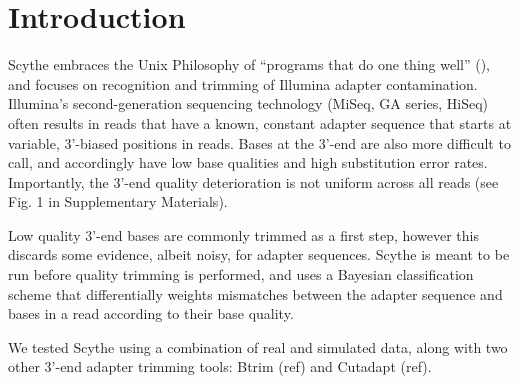 \documentclass{bioinfo}
\begin{document}
\section{Introduction}
Scythe embraces the Unix Philosophy of ``programs that do one thing
well'' (\citealp{raymond2003}), and focuses on recognition and
trimming of Illumina adapter contamination. Illumina's
second-generation sequencing technology (MiSeq, GA series, HiSeq)
often results in reads that have a known, constant adapter sequence
that starts at variable, 3'-biased positions in reads. Bases at the
3'-end are also more difficult to call, and accordingly have low base
qualities and high substitution error rates. Importantly, the 3'-end
quality deterioration is not uniform across all reads (see Fig. 1 in
Supplementary Materials).

Low quality 3'-end bases are commonly trimmed as a first step, however
this discards some evidence, albeit noisy, for adapter
sequences. Scythe is meant to be run before quality trimming is
performed, and uses a Bayesian classification scheme that
differentially weights mismatches between the adapter sequence and
bases in a read according to their base quality.

We tested Scythe using a combination of real and simulated data, along
with two other 3'-end adapter trimming tools: Btrim (ref) and Cutadapt
(ref).


\end{document}
